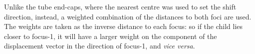 Unlike the tube end-caps, where the nearest centre was used to set the shift direction, instead, a
weighted combination of the distances to both foci are used.   The weights are taken as the inverse distance
to each focus: so if the child lies closer to focus-1, it will have a larger weight
on the component of the displacement vector in the direction of focus-1, and {\em vice versa}. 

%
%
%
%
%
